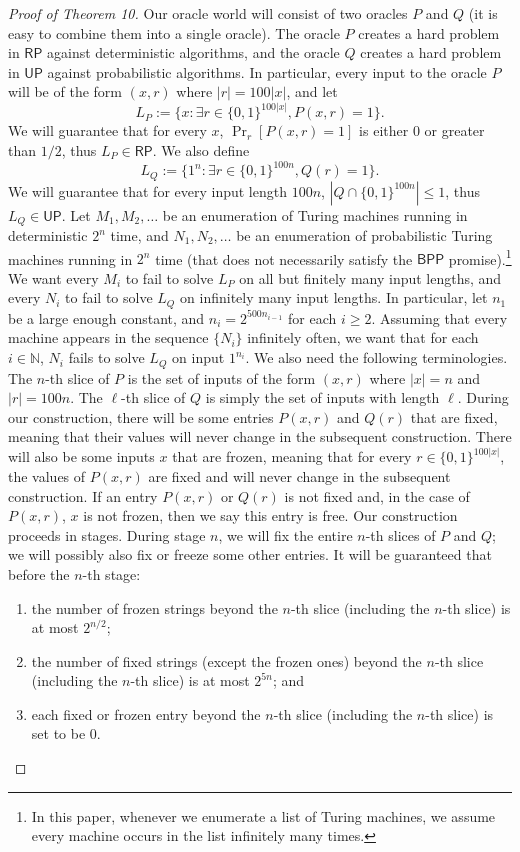 \documentclass[10pt,a4paper]{article}
\begin{document}
\begin{proof}[Proof of Theorem 10]
Our oracle world will consist of two oracles $P$ and $Q$ (it is easy to combine them into a single oracle). The oracle $P$ creates a hard problem in $\mathsf{RP}$ against deterministic algorithms, and the oracle $Q$ creates a hard problem in $\mathsf{UP}$ against probabilistic algorithms. In particular, every input to the oracle $P$ will be of the form $(x,r)$ where $|r|=100|x|$, and let
\[L_P:=\{x:\exists r\in\{0,1\}^{100|x|},P(x,r)=1\}.\]
We will guarantee that for every $x$, $\Pr_r[P(x,r)=1]$ is either $0$ or greater than $1/2$, thus $L_P\in\mathsf{RP}$. We also define
\[L_Q:=\{1^n:\exists r\in\{0,1\}^{100n},Q(r)=1\}.\]
We will guarantee that for every input length $100n$, $|Q\cap\{0,1\}^{100n}|\leq1$, thus $L_Q\in\mathsf{UP}$.
Let $M_1,M_2,\ldots$ be an enumeration of Turing machines running in deterministic $2^n$ time, and $N_1,N_2,\ldots$ be an enumeration of probabilistic Turing machines running in $2^n$ time (that does not necessarily satisfy the $\mathsf{BPP}$ promise).\footnote{In this paper, whenever we enumerate a list of Turing machines, we assume every machine occurs in the list infinitely many times.} We want every $M_i$ to fail to solve $L_P$ on all but finitely many input lengths, and every $N_i$ to fail to solve $L_Q$ on infinitely many input lengths. In particular, let $n_1$ be a large enough constant, and $n_i=2^{500n_{i-1}}$ for each $i\geq2$. Assuming that every machine appears in the sequence $\{N_i\}$ infinitely often, we want that for each $i\in\mathbb N$, $N_i$ fails to solve $L_Q$ on input $1^{n_i}$.
We also need the following terminologies. The $n$-th slice of $P$ is the set of inputs of the form $(x,r)$ where $|x|=n$ and $|r|=100n$. The $\ell$-th slice of $Q$ is simply the set of inputs with length $\ell$. During our construction, there will be some entries $P(x,r)$ and $Q(r)$ that are fixed, meaning that their values will never change in the subsequent construction. There will also be some inputs $x$ that are frozen, meaning that for every $r\in\{0,1\}^{100|x|}$, the values of $P(x,r)$ are fixed and will never change in the subsequent construction. If an entry $P(x,r)$ or $Q(r)$ is not fixed and, in the case of $P(x,r)$, $x$ is not frozen, then we say this entry is free.
Our construction proceeds in stages. During stage $n$, we will fix the entire $n$-th slices of $P$ and $Q$; we will possibly also fix or freeze some other entries. It will be guaranteed that before the $n$-th stage:
\begin{enumerate}
\item the number of frozen strings beyond the $n$-th slice (including the $n$-th slice) is at most $2^{n/2}$;
\item the number of fixed strings (except the frozen ones) beyond the $n$-th slice (including the $n$-th slice) is at most $2^{5n}$; and
\item each fixed or frozen entry beyond the $n$-th slice (including the $n$-th slice) is set to be $0$.
\end{enumerate}

\end{proof}
\end{document}
